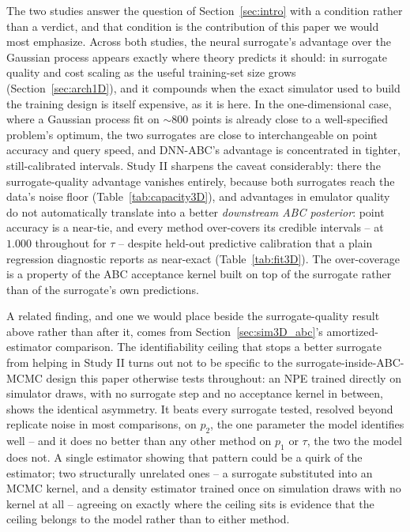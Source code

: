 \documentclass[sn-basic,iicol,pdflatex]{sn-jnl}
\begin{document}
The two studies answer the question of Section~\ref{sec:intro} with a
condition rather than a verdict, and that condition is the contribution of this
paper we would most emphasize. Across both studies, the neural surrogate's advantage
over the Gaussian process appears exactly where theory predicts it should: in
surrogate quality and cost scaling as the useful training-set size grows
(Section~\ref{sec:arch1D}), and it compounds when the exact simulator used to
build the training design is itself expensive, as it is here. In the one-dimensional case, where a Gaussian process fit on
$\sim 800$ points is already close to a well-specified problem's optimum,
the two surrogates are close to interchangeable on point accuracy and query
speed, and DNN-ABC's advantage is concentrated in tighter, still-calibrated
intervals. Study II sharpens the caveat considerably: there the
surrogate-quality advantage vanishes entirely, because both surrogates reach
the data's noise floor (Table~\ref{tab:capacity3D}), and advantages in
emulator quality do not automatically
translate into a better \emph{downstream ABC posterior}: point accuracy is a
near-tie, and every method over-covers its credible intervals -- at $1.000$
throughout for $\tau$ -- despite held-out predictive calibration that a plain
regression diagnostic reports as near-exact (Table~\ref{tab:fit3D}). The
over-coverage is a property of the ABC acceptance kernel built on top of the
surrogate rather than of the surrogate's own predictions.

A related finding, and one we would place beside the surrogate-quality
result above rather than after it, comes from Section~\ref{sec:sim3D_abc}'s
amortized-estimator comparison. The identifiability ceiling that stops a
better surrogate from helping in Study II turns out not to be specific to
the surrogate-inside-ABC-MCMC design this paper otherwise tests throughout:
an NPE trained directly on simulator draws, with no surrogate step and no
acceptance kernel in between, shows the identical asymmetry. It beats every
surrogate tested, resolved beyond replicate noise in most comparisons, on
$p_2$, the one parameter the model identifies well -- and it does no better
than any other method on $p_1$ or $\tau$, the two the model does not. A
single estimator showing that pattern could be a quirk of the estimator; two
structurally unrelated ones -- a surrogate substituted into an MCMC kernel,
and a density estimator trained once on simulation draws with no kernel at
all -- agreeing on exactly where the ceiling sits is evidence that the
ceiling belongs to the model rather than to either method.
\end{document}
